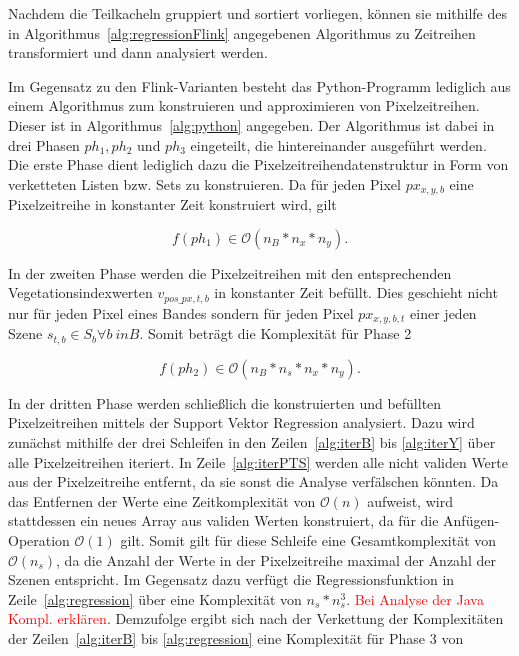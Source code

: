Nachdem die Teilkacheln gruppiert und sortiert vorliegen, können sie mithilfe des in Algorithmus~\ref{alg:regressionFlink} angegebenen Algorithmus zu Zeitreihen transformiert und dann analysiert werden.



Im Gegensatz zu den Flink-Varianten besteht das Python-Programm lediglich aus einem Algorithmus zum konstruieren und approximieren von Pixelzeitreihen. Dieser ist in Algorithmus~\ref{alg:python} angegeben. Der Algorithmus ist dabei in drei Phasen $ph_1, ph_2$ und $ph_3$ eingeteilt, die hintereinander ausgeführt werden. Die erste Phase dient lediglich dazu die Pixelzeitreihendatenstruktur in Form von verketteten Listen bzw. Sets zu konstruieren. Da für jeden Pixel $px_{x, y, b}$ eine Pixelzeitreihe in konstanter Zeit konstruiert wird, gilt  

\begin{equation} \label{eq:complexityPython1}
f(ph_1) \in \mathcal{O}(n_B * n_x * n_y).
\end{equation}


In der zweiten Phase werden die Pixelzeitreihen mit den entsprechenden Vegetationsindexwerten $v_{pos\_px, t, b}$ in konstanter Zeit befüllt. Dies geschieht nicht nur für jeden Pixel eines Bandes sondern für jeden Pixel $px_{x, y, b, t}$ einer jeden Szene $s_{t, b} \in S_b \forall b \ in B$. Somit beträgt die Komplexität für Phase 2 
 
\begin{equation} \label{eq:complexityPython2}
f(ph_2) \in \mathcal{O}(n_B * n_s * n_x * n_y).
\end{equation}
 
In der dritten Phase werden schließlich die konstruierten und befüllten Pixelzeitreihen mittels der Support Vektor Regression analysiert. Dazu wird zunächst mithilfe der drei Schleifen in den Zeilen~\ref{alg:iterB} bis \ref{alg:iterY} über alle Pixelzeitreihen iteriert. In Zeile~\ref{alg:iterPTS} werden alle nicht validen Werte aus der Pixelzeitreihe entfernt, da sie sonst die Analyse verfälschen könnten. Da das Entfernen der Werte eine Zeitkomplexität von $\mathcal{O}(n)$ aufweist, wird stattdessen ein neues Array aus validen Werten konstruiert, da für die Anfügen-Operation $\mathcal{O}(1)$ gilt. Somit gilt für diese Schleife eine Gesamtkomplexität von $\mathcal{O}(n_s)$, da die Anzahl der Werte in der Pixelzeitreihe maximal der Anzahl der Szenen entspricht. Im Gegensatz dazu verfügt die Regressionsfunktion in Zeile~\ref{alg:regression} über eine Komplexität von $n_s * n_s^3$. \textcolor{red}{Bei Analyse der Java Kompl. erklären}. Demzufolge ergibt sich nach der Verkettung der Komplexitäten der Zeilen~\ref{alg:iterB} bis \ref{alg:regression} eine Komplexität für Phase 3 von 

